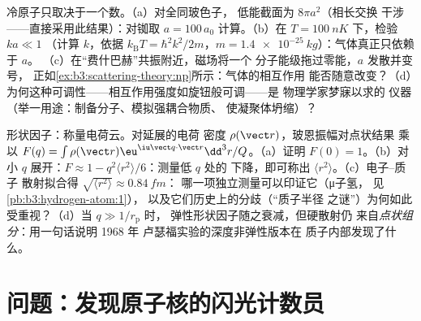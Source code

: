 \begin{exercise}[$\star\star\star$]\label{exo:b3:scattering-theory:11}
冷原子只取决于一个数。（a）对全同玻色子，
低能截面为 $8\pi a^2$（相长交换
干涉——直接采用此结果）：对铷取 $a =
100\,a_0$ 计算。（b）在 $T = \qty{100}{nK}$ 下，检验 $ka \ll 1$
（计算 $k$，依据 $k_{\text{B}}T = \hbar^2k^2/2m$，$m =
\qty{1.4e-25}{kg}$）：气体真正只依赖于 $a$。
（c）在“费什巴赫”共振附近，磁场将一个
分子能级拖过零能，$a$ 发散并变号，
正如\cref{ex:b3:scattering-theory:np}所示：气体的相互作用
能否随意改变？（d）为何这种可调性——相互作用强度如旋钮般可调——是
物理学家梦寐以求的
仪器（举一用途：制备分子、模拟强耦合物质、
使凝聚体坍缩）？
\end{exercise}

\begin{exercise}[$\star\star\star$]\label{exo:b3:scattering-theory:12}
形状因子：称量电荷云。对延展的电荷
密度 $\rho(\vect r)$，玻恩振幅对点状结果
乘以 $F(q) = \int\rho(\vect r)\eu^{\iu\vect q\cdot\vect r}
\dd^3r/Q$。（a）证明 $F(0) = 1$。（b）对小 $q$ 展开：$F
\approx 1 - q^2\langle r^2\rangle/6$：测量低 $q$ 处的
下降，即可称出 $\langle r^2\rangle$。（c）电子–质子
散射拟合得 $\sqrt{\langle r^2\rangle} \approx \qty{0.84}{fm}$：
哪一项独立测量可以印证它（μ子氢，
见\cref{pb:b3:hydrogen-atom:1}），
以及它们历史上的分歧（“质子半径
之谜”）为何如此受重视？（d）当 $q \gg 1/r_{\text{p}}$ 时，
弹性形状因子随之衰减，但硬散射仍
来自\emph{点状组分}：用一句话说明 1968 年
卢瑟福实验的深度非弹性版本在
质子内部发现了什么。
\end{exercise}

\section{问题：发现原子核的闪光计数员}

